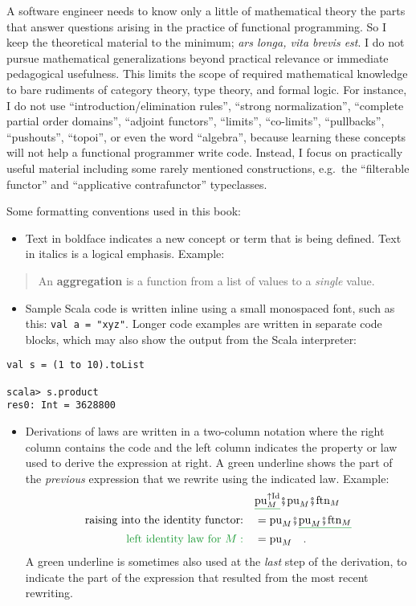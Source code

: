 A software engineer needs to know only a little of mathematical theory
\textendash{} the parts that answer questions arising in the practice
of functional programming. So I keep the theoretical material to the
minimum; \emph{ars longa, vita brevis est}. I do not pursue mathematical
generalizations beyond practical relevance or immediate pedagogical
usefulness. This limits the scope of required mathematical knowledge
to bare rudiments of category theory, type theory, and formal logic.
For instance, I do not use ``introduction/elimination rules'', ``strong
normalization'', ``complete partial order domains'', ``adjoint
functors'', ``limits'', ``co-limits'', ``pullbacks'', ``pushouts'',
``topoi'', or even the word ``algebra'', because learning these
concepts will not help a functional programmer write code. Instead,
I focus on practically useful material \textendash{} including some
rarely mentioned constructions, e.g.~the ``filterable functor''
and ``applicative contrafunctor'' typeclasses.

Some formatting conventions used in this book:
\begin{itemize}
\item Text in boldface indicates a new concept or term that is being defined.
Text in italics is a logical emphasis. Example:
\end{itemize}
\begin{quotation}
An \textbf{aggregation} is a function from a list
of values to a \emph{single} value.
\end{quotation}
\begin{itemize}
\item Sample Scala code is written inline using a small monospaced font,
such as this: \lstinline!val a = "xyz"!. Longer code examples are
written in separate code blocks, which may also show the output from
the Scala interpreter:
\end{itemize}
\begin{lstlisting}
val s = (1 to 10).toList

scala> s.product
res0: Int = 3628800 
\end{lstlisting}

\begin{itemize}
\item Derivations of laws are written in a two-column notation where the
right column contains the code and the left column indicates the property
or law used to derive the expression at right. A green underline shows
the part of the \emph{previous} expression that we rewrite using the
indicated law. Example: 
\begin{align*}
 & \gunderline{\text{pu}_{M}^{\uparrow\text{Id}}}\bef\text{pu}_{M}\bef\text{ftn}_{M}\\
\text{raising into the identity functor:}\quad & =\text{pu}_{M}\bef\gunderline{\text{pu}_{M}\bef\text{ftn}_{M}}\\
{\color{greenunder}\text{left identity law for }M:}\quad & =\text{pu}_{M}\quad.
\end{align*}
A green underline is sometimes also used at the \emph{last} step of
the derivation, to indicate the part of the expression that resulted
from the most recent rewriting.
\end{itemize}

